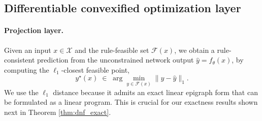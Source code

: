 \documentclass{article}
\newcommand {\cl}[1]{{\color{blue}{(Can: #1}}}
\theoremstyle{plain}
\newtheorem{theorem}{Theorem}[section]
\theoremstyle{definition}
\theoremstyle{remark}
\begin{document}




\subsection{Differentiable convexified optimization layer}\label{sec:eqconvex}
\paragraph{Projection layer.}
Given an input $x\in\mathcal{X}$ and the rule-feasible set $\mathcal{F}(x)$, we obtain a rule-consistent prediction from the unconstrained network output $\hat y=f_\theta(x)$,
by computing the $\ell_1$-closest feasible point,
\begin{equation}
y^\star(x)
\;\in\;
\arg\min_{y\in \mathcal{F}(x)} \|y-\hat y\|_1.
\label{eq:l1_proj}
\end{equation}
We use the $\ell_1$ distance because it admits an exact linear epigraph form that can be formulated as a linear program. This is crucial for our exactness results shown next in Theorem \ref{thm:dnf_exact}.
\end{document}

